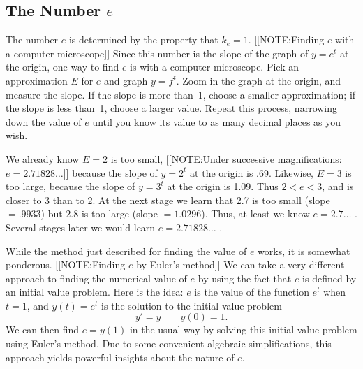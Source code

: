 \subsection{The Number $e$} 
\label{subsec:the-number-e}

	The number $e$ is determined by the property that $k_e = 1$.  
[[NOTE:Finding $e$ with a computer microscope]]
Since this number is the slope of the graph of $y = e^t$ at the
origin, one way to find $e$ is with a computer microscope.  Pick an
approximation $E$ for $e$ and graph $y = f^t$.  Zoom in the graph at
the origin, and measure the slope.  If the slope is more than~1,
choose a smaller approximation; if the slope is less than~1, choose a
larger value.  Repeat this process, narrowing down the value of $e$
until you know its value to as many decimal places as you wish.

	We already know $E= 2$ is too small, 
[[NOTE:Under successive magnifications: $e = 2.71828\ldots$]]
because the slope of $y = 2^t$ at the origin is .69.  Likewise, $E = 3$ is too large, because the slope of $y = 3^t$ at the origin is 1.09.  Thus $2 < e < 3$, and is closer to 3 than to 2.  
At the next stage we learn that 2.7 is too small (slope $= .9933$) but 2.8 is too large (slope $= 1.0296$).  Thus, at least we know $e = 2.7\ldots$ .  Several stages later we would learn $e = 2.71828\ldots$ .  



	While the method just described for finding the value of $e$ works, it is somewhat ponderous. 
[[NOTE:Finding $e$ by  Euler's method]]
We can take a very different approach to finding the numerical value of $e$ by using the fact that $e$ is defined by an initial value problem.  Here is the idea: $e$ is the value of the function $e^t$ when $t = 1$, and $y(t) = e^t$ is the solution to the initial value problem 
	\[
y' = y \qquad y(0) = 1.
\]
We can then find $e = y(1)$ in the usual way by solving this initial value problem using Euler's method.  Due to some convenient algebraic simplifications, this approach yields powerful insights about the nature of $e$.

